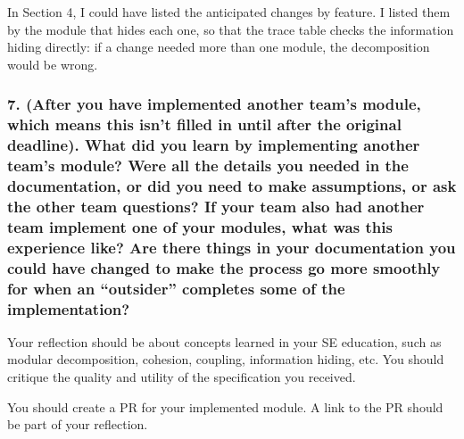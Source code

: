 \documentclass[12pt, titlepage]{article}
\begin{document}
In Section 4, I could have listed the anticipated changes by feature. I listed
them by the module that hides each one, so that the trace table checks the
information hiding directly: if a change needed more than one module, the
decomposition would be wrong.

\subsubsection*{7. (After you have implemented another team's module, which
means this isn't filled in until after the original deadline). What did you
learn by implementing another team's module? Were all the details you needed in
the documentation, or did you need to make assumptions, or ask the other team
questions? If your team also had another team implement one of your modules,
what was this experience like? Are there things in your documentation you could
have changed to make the process go more smoothly for when an ``outsider''
completes some of the implementation?}

Your reflection should be about concepts learned in your SE education, such as
modular decomposition, cohesion, coupling, information hiding, etc. You should
critique the quality and utility of the specification you received.

You should create a PR for your implemented module. A link to the PR should be
part of your reflection.
\end{document}
